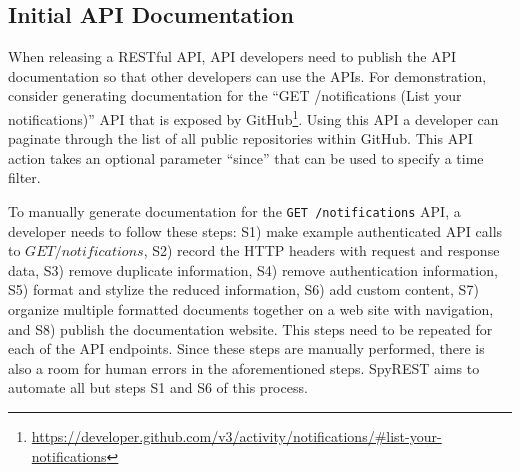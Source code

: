 \documentclass[conference]{IEEEtran}
\begin{document}
\subsection{Initial API Documentation} %
When releasing a RESTful API, API developers need to publish the API documentation so that other developers can use the APIs. For demonstration, consider generating documentation for the ``GET /notifications (List your notifications)'' API that is exposed by GitHub\footnote{\url{https://developer.github.com/v3/activity/notifications/#list-your-notifications}}. Using this API a developer can paginate through the list of all public repositories within GitHub. This API action takes an optional parameter ``since'' that can be used to specify a time filter.

To manually generate documentation for the \texttt{GET /notifications} API, a developer needs to follow these steps: S1) make example authenticated API calls to $GET /notifications$, S2) record the HTTP headers with request and response data, S3) remove duplicate information, S4) remove authentication information, S5) format and stylize the reduced information, S6) add custom content, S7) organize multiple formatted documents together on a web site with navigation, and S8) publish the documentation website. This steps need to be repeated for each of the API endpoints. Since these steps are manually performed, there is also a room for human errors in the aforementioned steps. SpyREST aims to automate all but steps S1 and S6 of this process.
\end{document}
